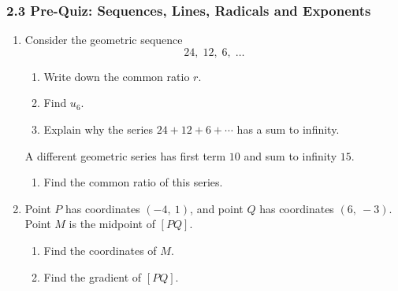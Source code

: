 \documentclass[12pt, twoside]{article}
\begin{document}
\subsubsection*{2.3 Pre-Quiz: Sequences, Lines, Radicals and Exponents}

\begin{enumerate}[itemsep=0.15cm]

\item[1.]
Consider the geometric sequence
$$24,\; 12,\; 6,\; \ldots$$

\begin{enumerate}[itemsep=0.1cm]
  \item Write down the common ratio $r$.
  \item Find $u_{6}$.
  \item Explain why the series $24 + 12 + 6 + \cdots$ has a sum to infinity.
\end{enumerate}

A different geometric series has first term $10$ and sum to infinity $15$.

\begin{enumerate}[itemsep=0.1cm]
  \item[(d)] Find the common ratio of this series.
\end{enumerate}


\newpage

\item[2.]
Point $P$ has coordinates $(-4,\ 1)$, and point $Q$ has coordinates
$(6,\ -3)$. Point $M$ is the midpoint of $[PQ]$.

\begin{enumerate}[itemsep=0.1cm]
  \item Find the coordinates of $M$.
  \item Find the gradient of $[PQ]$.
\end{enumerate}


\end{enumerate}
\end{document}
